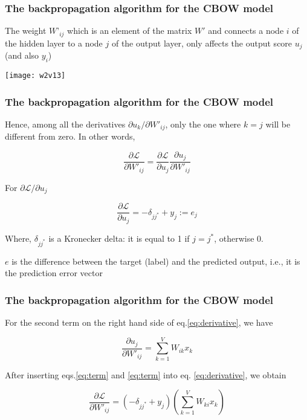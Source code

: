 \begin{frame}[fragile]\frametitle{The backpropagation algorithm for the CBOW model}
The weight $W’_{ij}$ which is an element of the matrix $W'$ and connects a node 
$i$ of the hidden layer to a node $j$ of the output layer, 
only affects the output score $u_j$ (and also $y_i$)

\begin{center}
\texttt{[image: w2v13]}
\end{center} 

\end{frame}

\begin{frame}[fragile]\frametitle{The backpropagation algorithm for the CBOW model}
Hence, among all the derivatives $\partial u_k/\partial W'_{ij}$, only the one where $k=j$ will be different from zero. In other words,

\begin{equation}
\frac{\partial\mathcal{L}}{\partial W'_{ij}} = \frac{\partial\mathcal{L}}{\partial u_j}\frac{\partial u_j}
{\partial W'_{ij}}
\label{eq:derivative}
\end{equation}

For $\partial \mathcal{L}/\partial u_j$

\begin{equation}
\frac{\partial\mathcal{L}}{\partial u_j} = -\delta_{jj^*} + y_j := e_j
\label{eq:term}
\end{equation}

Where, $\delta_{jj^*}$ is a Kronecker delta: it is equal to 1 if $j=j^*$, otherwise 0.

$e$ is the difference between the target (label) and the predicted output, i.e., it is the prediction error vector


\end{frame}


\begin{frame}[fragile]\frametitle{The backpropagation algorithm for the CBOW model}

For the second term on the right hand side of eq.\ref{eq:derivative}, we have

\begin{equation}
\frac{\partial u_j}{\partial W'_{ij}} = \sum_{k=1}^V W_{ik}x_k
\label{eq:term}
\end{equation}

After inserting eqs.\ref{eq:term} and \ref{eq:term} into eq. \ref{eq:derivative}, we obtain

\begin{equation}
\frac{\partial\mathcal{L}}{\partial W'_{ij}} = (-\delta_{jj^*} + y_j) \left(\sum_{k=1}^V W_{ki}x_k\right)
\label{eq:backprop1}
\end{equation}


\end{frame}

